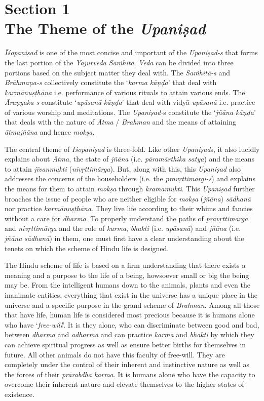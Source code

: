 \chapter{\textbf{Section 1\\ The Theme of the \emph{Upaniṣad}}}

\emph{Īśopaniṣad} is one of the most concise and important of the \emph{Upaniṣad-s} that forms the last portion of the \emph{Yajurveda Saṁhitā}. \emph{Veda} can be divided into three portions based on the subject matter they deal with. The \emph{Saṁhitā-s} and \emph{Brāhmaṇa-s} collectively constitute the `\emph{karma kāṇḍa}' that deal with \emph{karmānuṣṭhāna} i.e. performance of various rituals to attain various ends. The \emph{Āraṇyaka-s} constitute `\emph{upāsanā} \emph{kāṇḍa}' that deal with vidyā \emph{upāsanā} i.e. practice of various worship and meditations. The \emph{Upaniṣad-}s constitute the `\emph{jñāna kāṇḍa}' that deals with the nature of \emph{Ātma} / \emph{Brahman} and the means of attaining \emph{ātmajñāna} and hence \emph{mokṣa}.
\vskip 2pt

The central theme of \emph{Īśopaniṣad} is three-fold. Like other \emph{Upaniṣad}s, it also lucidly explains about \emph{Ātma}, the state of \emph{jñāna} (i.e. \emph{pāramārthika} \emph{satya}) and the means to attain \emph{jīvanmukti} (\emph{nivṛttimārga}). But, along with this, this \emph{Upaniṣad} also addresses the concerns of the householders (i.e. the \emph{pravṛttimārgī-s}) and explains the means for them to attain \emph{mokṣa} through \emph{kramamukti}. This \emph{Upaniṣad} further broaches the issue of people who are neither eligible for \emph{mokṣa} (\emph{jñāna}) \emph{sādhanā} nor practice \emph{karmānuṣṭhāna}. They live life according to their whims and fancies without a care for \emph{dharma}. To properly understand the paths of \emph{pravṛttimārga} and \emph{nivṛttimārga} and the role of \emph{karma}, \emph{bhakti} (i.e. \emph{upāsanā}) and \emph{jñāna} (i.e. \emph{jñāna} \emph{sādhanā}) in them, one must first have a clear understanding about the tenets on which the scheme of Hindu life is designed.
\vskip 2.3pt

The Hindu scheme of life is based on a firm understanding that there exists a meaning and a purpose to the life of a being, howsoever small or big the being may be. From the intelligent humans down to the animals, plants and even the inanimate entities, everything that exist in the universe has a unique place in the universe and a specific purpose in the grand scheme of \emph{Brahman}. Among all those that have life, human life is considered most precious because it is humans alone who have `\emph{free-will}'. It is they alone, who can discriminate between good and bad, between \emph{dharma} and \emph{adharma} and can practice \emph{karma} and \emph{bhakti} by which they can achieve spiritual progress as well as ensure better births for themselves in future. All other animals do not have this faculty of free-will. They are completely under the control of their inherent and instinctive nature as well as the forces of their \emph{prārabdha} \emph{karma}. It is humans alone who have the capacity to overcome their inherent nature and elevate themselves to the higher states of existence.
\vskip 4pt

